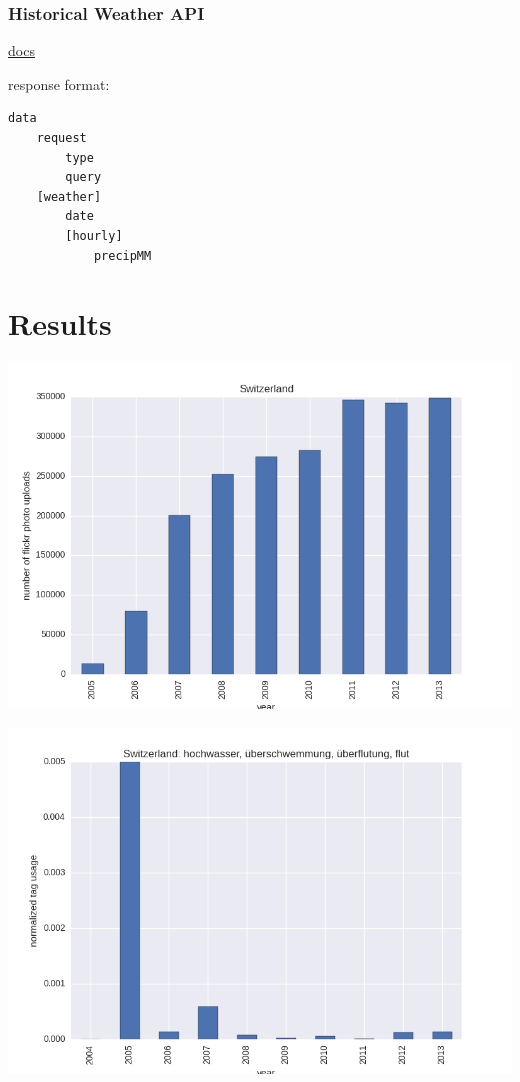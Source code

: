 \documentclass[letterpaper,10pt,english]{sphinxmanual}
\begin{document}
\subsection{Historical Weather API}
\label{main/helper-apis:historical-weather-api}
\href{http://www.worldweatheronline.com/api/docs/historical-weather-api.aspx}{docs}

response format:

\begin{Verbatim}[commandchars=\\\{\}]
data
    request
        type
        query
    [weather]
        date
        [hourly]
            precipMM
\end{Verbatim}


\chapter{Results}
\label{main/results::doc}\label{main/results:results}
\includegraphics{flickr_switzerland.png}

\includegraphics{flickr_flooding_switzerland.png}
\end{document}
